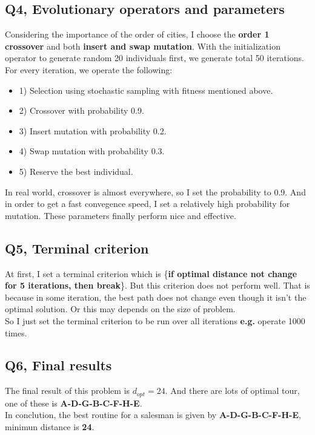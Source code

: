 \documentclass{article}
\begin{document}
\subsection*{Q4, Evolutionary operators and parameters}
Considering the importance of the order of cities,
I choose the \textbf{order 1 crossover} and both \textbf{insert and swap mutation}.
With the initialization operator to generate random 20 individuals first, we generate total 50 iterations.\\
\newpage
For every iteration, we operate the following:
\begin{itemize}
  \item 1) Selection using stochastic sampling with fitness mentioned above.
  \item 2) Crossover with probability 0.9.
  \item 3) Insert mutation with probability 0.2.
  \item 4) Swap mutation with probability 0.3.
  \item 5) Reserve the best individual.
\end{itemize}
In real world, crossover is almost everywhere, so I set the probability to 0.9.
And in order to get a fast convegence speed, I set a relatively high probability for mutation.
These parameters finally perform nice and effective.

\subsection*{Q5, Terminal criterion}
At first, I set a terminal criterion which is \{\textbf{if optimal distance not change for 5 iterations, then break}\}.
But this criterion does not perform well.
That is because in some iteration, the best path does not change even though it isn't the optimal solution.
Or this may depends on the size of problem.\\
So I just set the terminal criterion to be run over all iterations \textbf{e.g.} operate 1000 times.

\subsection*{Q6, Final results}
The final result of this problem is $d_{opt}=24$.
And there are lots of optimal tour, one of these is \textbf{A-D-G-B-C-F-H-E}.\\
In conclution, the best routine for a salesman is given by \textbf{A-D-G-B-C-F-H-E}, minimun distance is \textbf{24}.
\end{document}
